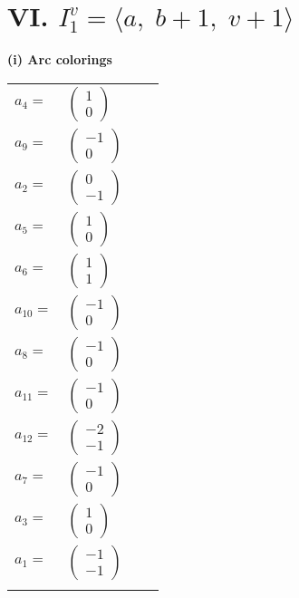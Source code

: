 \documentclass[1p]{elsarticle_modified}
\theoremstyle{definition}
\begin{document}
\centering \section*{VI. $I^v_{1}= \langle a,\;b+1,\;v+1 \rangle$}
\flushleft \textbf{(i) Arc colorings}\\
\begin{tabular}{m{7pt} m{180pt} m{7pt} m{180pt} }
\flushright $a_{4}=$&$\begin{pmatrix}1\\0\end{pmatrix}$ \\
\flushright $a_{9}=$&$\begin{pmatrix}-1\\0\end{pmatrix}$ \\
\flushright $a_{2}=$&$\begin{pmatrix}0\\-1\end{pmatrix}$ \\
\flushright $a_{5}=$&$\begin{pmatrix}1\\0\end{pmatrix}$ \\
\flushright $a_{6}=$&$\begin{pmatrix}1\\1\end{pmatrix}$ \\
\flushright $a_{10}=$&$\begin{pmatrix}-1\\0\end{pmatrix}$ \\
\flushright $a_{8}=$&$\begin{pmatrix}-1\\0\end{pmatrix}$ \\
\flushright $a_{11}=$&$\begin{pmatrix}-1\\0\end{pmatrix}$ \\
\flushright $a_{12}=$&$\begin{pmatrix}-2\\-1\end{pmatrix}$ \\
\flushright $a_{7}=$&$\begin{pmatrix}-1\\0\end{pmatrix}$ \\
\flushright $a_{3}=$&$\begin{pmatrix}1\\0\end{pmatrix}$ \\
\flushright $a_{1}=$&$\begin{pmatrix}-1\\-1\end{pmatrix}$\\&\end{tabular}
\end{document}
